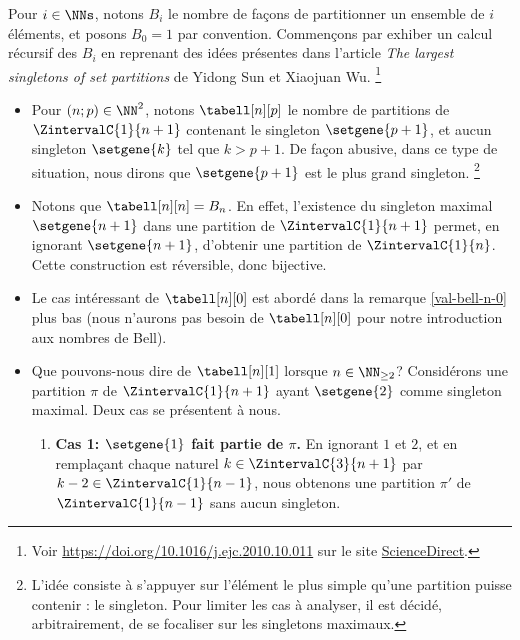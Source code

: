 Pour $i \in \NNs$, notons $B_i$ le nombre de façons de partitionner un ensemble de $i$ éléments, et posons $B_0 = 1$ par convention.
Commençons par exhiber un calcul récursif des $B_i$ en reprenant des idées présentes dans l'article
\emph{\og The largest singletons of set partitions \fg}
de Yidong Sun et Xiaojuan Wu.%
    \footnote{
    	Voir
	\url{https://doi.org/10.1016/j.ejc.2010.10.011}
	sur le site \href{https://www.sciencedirect.com/}{ScienceDirect}.
}
%
\begin{itemize}
    \item Pour $(n ; p) \in \NN^2$, notons $\tabell[n][p]$ le nombre de partitions de $\ZintervalC{1}{n+1}$ contenant le singleton $\setgene{p+1}$, et aucun singleton $\setgene{k}$ tel que $k > p+1$.
    De façon abusive, dans ce type de situation, nous dirons que $\setgene{p+1}$ est le plus grand singleton.%
    \footnote{
        L’idée consiste à s’appuyer sur l’élément le plus simple qu’une partition puisse contenir : le singleton.
        Pour limiter les cas à analyser, il est décidé, arbitrairement, de se focaliser sur les singletons maximaux.
    }


    \item Notons que $\tabell[n][n] = B_n$.
    En effet,
    l'existence du singleton maximal $\setgene{n+1}$ dans une partition de $\ZintervalC{1}{n+1}$ permet, en ignorant $\setgene{n+1}$, d'obtenir une partition de $\ZintervalC{1}{n}$.
    Cette construction est réversible, donc bijective.


    \item Le cas intéressant de $\tabell[n][0]$ est abordé dans la remarque \ref{val-bell-n-0} plus bas (nous n'aurons pas besoin de $\tabell[n][0]$ pour notre introduction aux nombres de Bell).


    \item Que pouvons-nous dire de $\tabell[n][1]$ lorsque $n \in \NN_{\geq2}$?
    Considérons une partition $\pi$ de $\ZintervalC{1}{n+1}$ ayant $\setgene{2}$ comme singleton maximal.
    Deux cas se présentent à nous.
    \begin{enumerate}
    	\item \textbf{\boldmath Cas 1: $\setgene{1}$ fait partie de $\pi$.}
        En ignorant $1$ et $2$,
        et
        en remplaçant chaque naturel $k \in \ZintervalC{3}{n+1}$ par $k-2 \in \ZintervalC{1}{n-1}$,
        nous obtenons une partition $\pi'$ de $\ZintervalC{1}{n-1}$ sans aucun singleton.



\end{enumerate}
\end{itemize}
